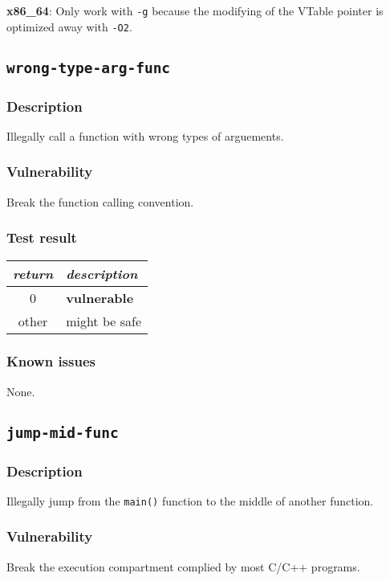 \documentclass[a4paper]{book}
\begin{document}
\textbf{x86\_64}: Only work with \texttt{-g} because the modifying of the VTable pointer is optimized away with \texttt{-O2}.


\newpage
\subsection{\texttt{wrong-type-arg-func}}\label{test-wrong-type-arg-func}

\subsubsection{Description}
Illegally call a function with wrong types of arguements.

\subsubsection{Vulnerability}
Break the function calling convention.

\subsubsection{Test result}
\begin{tabular}{cl}
  \toprule
  \emph{return}  & \emph{description} \\
  \midrule
  0              & \textbf{vulnerable} \\
  other          & might be safe \\
  \bottomrule
\end{tabular}

\subsubsection{Known issues}
None.

\newpage
\subsection{\texttt{jump-mid-func}}\label{test-jump-mid-func}

\subsubsection{Description}
Illegally jump from the \texttt{main()} function to the middle of another function.

\subsubsection{Vulnerability}
Break the execution compartment complied by most C/C++ programs.
\end{document}
